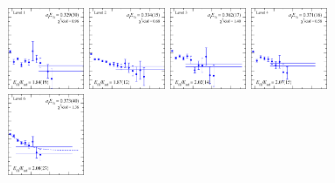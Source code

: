 \begin{figure}[H]
    \includegraphics[width=0.18\textwidth]{figures/sigmas/g2g/fits/fit_0.pdf}
    \includegraphics[width=0.18\textwidth]{figures/sigmas/g2g/fits/fit_3.pdf}
    \includegraphics[width=0.18\textwidth]{figures/sigmas/g2g/fits/fit_6.pdf}
    \includegraphics[width=0.18\textwidth]{figures/sigmas/g2g/fits/fit_2.pdf}\\
    \includegraphics[width=0.18\textwidth]{figures/sigmas/g2g/fits/fit_23.pdf}

\end{figure}
